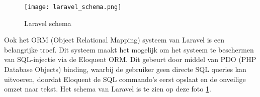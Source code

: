 \begin{figure}
    \centering
    \texttt{[image: laravel\_schema.png]}
    \caption[Laravel schema]{Laravel schema}
    \label{fig:laravel_schema}
\end{figure}

Ook het ORM (Object Relational Mapping) systeem van Laravel is een belangrijke troef. Dit systeem maakt het mogelijk om 
het systeem te beschermen van SQL-injectie via de Eloquent ORM. Dit gebeurt door middel van PDO (PHP Database Objects) binding, waarbij de
gebruiker geen directe SQL queries kan uitvoeren, doordat Eloquent de SQL commando's eerst opslaat en de onveilige omzet 
naar tekst. Het schema van Laravel is te zien op deze foto \ref{fig:laravel_schema}.

\begin{comment}
\section{\IfLanguageName{dutch}{Proof of Concept: Gebruiksvriendelijkheid en Effectiviteit van Pentesting Tools voor Webapplicaties}{Proof of Concept: Usability and Effectiveness of Pentesting Tools for Web Applications}}

In de proof of concept testen we de drie verschillende webomgevingen met de vernoemde pentesting tools om hun bruikbaarheid en effectiviteit te evalueren. 
Deze benadering is gericht op het vergelijken van de uitkomsten van pentests in elke omgeving, waardoor kan vastgesteld worden hoe de 
beveiligingsuitdagingen en kwetsbaarheden verschillen.

\subsubsection{\IfLanguageName{dutch}{Omgevingsdiversiteit}{Environmental diversity}}
De aanpak in deze proof of concept is gebaseerd op een realistische benadering, waarbij de drie pentesting tools worden gebruikt die zijn afgestemd 
op de unieke kenmerken van elke omgeving. Het team van Sinergio begrijpt dat geen twee webomgevingen dezelfde zijn en daarom is het belangrijk om een breed scala 
aan tools in te zetten om alle mogelijke kwetsbaarheden en beveiligingsrisico's aan het licht te brengen.

Door deze diversiteit aan tools kan het team niet alleen de specifieke omgeving testen met de best passende tool, maar ook de algehele robuustheid en 
weerbaarheid van de systemen maximaliseren. Elke tool heeft zijn eigen sterke punten en specialiteiten, waardoor een uitgebreide evaluatie mogelijk 
is die verder gaat dan alleen de oppervlakte.


\end{comment}
